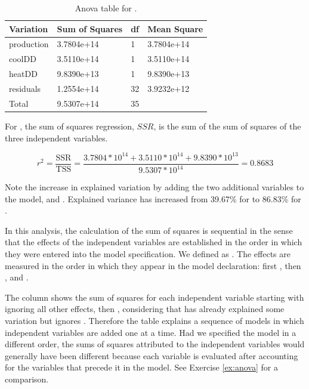 \begin{table}[htbp]

\begin{tabularx}{\textwidth}{X Y Y Y}

\toprule

\parbox[t]{1.7 cm}{Variation} &
Sum of Squares &
df &
Mean Square \\

\midrule

production & 3.7804e+14 & 1  & 3.7804e+14 \\
coolDD     & 3.5110e+14 & 1  & 3.5110e+14 \\
heatDD     & 9.8390e+13 & 1  & 9.8390e+13 \\
residuals  & 1.2554e+14 & 32 & 3.9232e+12 \\

\midrule

Total      & 9.5307e+14 & 35 &            \\

\bottomrule

\end{tabularx}

\caption{Anova table for .}
\label{tab:anova_mod1}
\end{table}

For , the sum of squares regression, $SSR$, is the sum of the sum of squares of the three independent variables.

\begin{equation*}
  r^2 = \frac{\text{SSR}}{\text{TSS}} = \frac{3.7804 * 10^{14} + 3.5110 * 10^{14} + 9.8390 * 10^{13}}{9.5307 * 10^{14}} = 0.8683
\end{equation*}

Note the increase in explained variation by adding the two additional variables to the model,  and . Explained variance has increased from 39.67\% for  to 86.83\% for .

In this analysis, the calculation of the sum of squares is sequential in the sense that the effects of the independent variables are established in the order in which they were entered into the model specification. We defined  as . The effects are measured in the order in which they appear in the model declaration: first , then , and . 

The column  shows the sum of squares for each independent variable starting with  ignoring all other effects, then , considering that  has already explained some variation but ignores . Therefore the table explains a sequence of models in which independent variables are added one at a time. Had we specified the model in a different order, the sums of squares attributed to the independent variables would generally have been different because each variable is evaluated after accounting for the variables that precede it in the model. See Exercise \ref{ex:anova} for a comparison.

